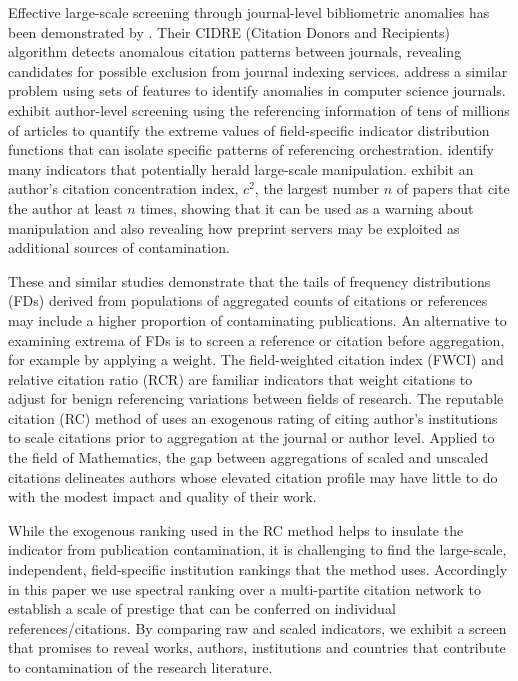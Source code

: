 \documentclass[10pt]{article}
\begin{document}
Effective large-scale screening through journal-level bibliometric anomalies has been demonstrated by \cite{kojakuDetectingAnomalousCitation2021}. Their CIDRE (Citation Donors and Recipients) algorithm detects anomalous citation patterns between journals, revealing candidates for possible exclusion from journal indexing services. \cite{chakrabortyIdentificationAnalysisCitation2020} address a similar problem using sets of features to identify anomalies in computer science journals. \cite{evdaimonMetricsDetectSmallScale2024} exhibit author-level screening using the referencing information of tens of millions of articles to quantify the extreme values of field-specific indicator distribution functions that can isolate specific patterns of referencing orchestration. \cite{ioannidisFeaturesSignalsPrecocious2024a, ioannidisEvolvingPatternsExtreme2024a, ioannidisQuantitativeResearchAssessment2023a} identify many indicators that potentially herald large-scale manipulation. \cite{ibrahimCitationManipulationCitation2025} exhibit an author's citation concentration index, $c^2$, the largest number $n$ of papers that cite the author at least $n$ times, showing that it can be used as a warning about manipulation and also revealing how preprint servers may be exploited as additional sources of contamination.

These and similar studies demonstrate that the tails of frequency distributions (FDs) derived from populations of aggregated counts of citations or references may include a higher proportion of contaminating publications. An alternative to examining extrema of FDs is to screen a reference or citation before aggregation, for example by applying a weight.  The field-weighted citation index (FWCI) and relative citation ratio (RCR) are familiar indicators that weight citations to adjust for benign referencing variations between fields of research. The reputable citation (RC) method of \cite{safonScreeningArticlesCitation2025} uses an exogenous rating of citing author's institutions to scale citations prior to aggregation at the journal or author level. Applied to the field of Mathematics, the gap between aggregations of scaled and unscaled citations delineates authors whose elevated citation profile may have little to do with the modest impact and quality of their work.

While the exogenous ranking used in the RC method helps to insulate the indicator from publication contamination, it is challenging to find the large-scale, independent, field-specific institution rankings that the method uses. Accordingly in this paper we use spectral ranking over a multi-partite citation network to establish a scale of prestige that can be conferred on individual references/citations. By comparing raw and scaled indicators, we exhibit a screen that promises to reveal works, authors, institutions and countries that contribute to contamination of the research literature.
\end{document}
